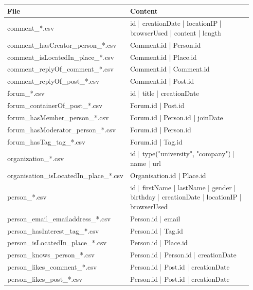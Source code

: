 \begin{table}[htbp]
    \scriptsize
    \centering
    \begin{tabular}{|p{4.6cm}|p{9.8cm}|}
        \hline
        \textbf{File} & \textbf{Content} \\
        \hline
        comment\_*.csv & id | creationDate | locationIP | browserUsed | content | length \\
        \hline
        comment\_hasCreator\_person\_*.csv & Comment.id | Person.id \\
        \hline
        comment\_isLocatedIn\_place\_*.csv & Comment.id | Place.id \\
        \hline
        comment\_replyOf\_comment\_*.csv & Comment.id | Comment.id \\
        \hline
        comment\_replyOf\_post\_*.csv &  Comment.id | Post.id \\
        \hline
        forum\_*.csv & id | title | creationDate \\
        \hline
        forum\_containerOf\_post\_*.csv & Forum.id | Post.id \\
        \hline
        forum\_hasMember\_person\_*.csv & Forum.id | Person.id | joinDate \\
        \hline
        forum\_hasModerator\_person\_*.csv & Forum.id | Person.id \\
        \hline
        forum\_hasTag\_tag\_*.csv & Forum.id | Tag.id \\
        \hline
        organization\_*.csv & id | type({"university", "company"}) | name | url \\
        \hline
        organisation\_isLocatedIn\_place\_*.csv & Organisation.id | Place.id \\
        \hline
        person\_*.csv & id | firstName | lastName | gender | birthday | creationDate | locationIP | browserUsed \\
        \hline
        person\_email\_emailaddress\_*.csv & Person.id | email \\
        \hline
        person\_hasInterest\_tag\_*.csv &  Person.id | Tag.id \\
        \hline
        person\_isLocatedIn\_place\_*.csv & Person.id | Place.id \\
        \hline
        person\_knows\_person\_*.csv & Person.id | Person.id | creationDate \\
        \hline
        person\_likes\_comment\_*.csv & Person.id | Post.id | creationDate \\
        \hline
        person\_likes\_post\_*.csv & Person.id | Post.id | creationDate \\

\end{tabular}
\end{table}
